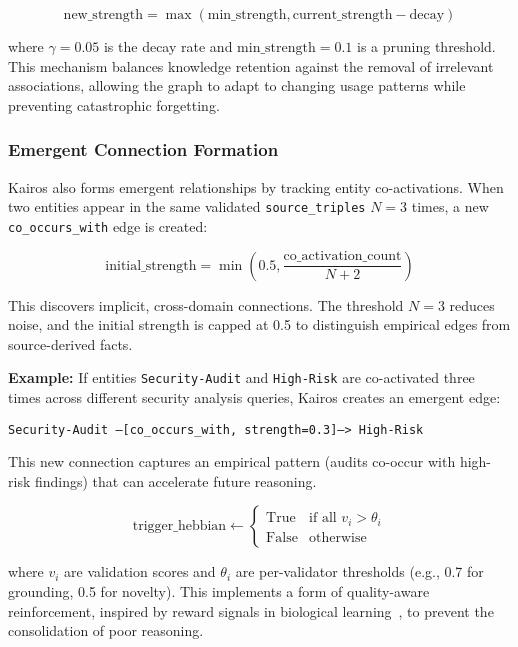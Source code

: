 \documentclass{article}
\begin{document}
\begin{equation}
\text{new\_strength} = \max(\text{min\_strength}, \text{current\_strength} - \text{decay})
\end{equation}

where $\gamma = 0.05$ is the decay rate and $\text{min\_strength} = 0.1$ is a pruning threshold. This mechanism balances knowledge retention against the removal of irrelevant associations, allowing the graph to adapt to changing usage patterns while preventing catastrophic forgetting.

\subsubsection{Emergent Connection Formation}

Kairos also forms emergent relationships by tracking entity co-activations. When two entities appear in the same validated \texttt{source\_triples} $N=3$ times, a new \texttt{co\_occurs\_with} edge is created:

\begin{equation}
\text{initial\_strength} = \min\left(0.5, \frac{\text{co\_activation\_count}}{N + 2}\right)
\end{equation}

This discovers implicit, cross-domain connections. The threshold $N=3$ reduces noise, and the initial strength is capped at 0.5 to distinguish empirical edges from source-derived facts.

\textbf{Example:} If entities \texttt{Security-Audit} and \texttt{High-Risk} are co-activated three times across different security analysis queries, Kairos creates an emergent edge:

\begin{center}
\texttt{Security-Audit --[co\_occurs\_with, strength=0.3]--> High-Risk}
\end{center}

This new connection captures an empirical pattern (audits co-occur with high-risk findings) that can accelerate future reasoning.

\begin{equation}
\text{trigger\_hebbian} \leftarrow \begin{cases}
\text{True} & \text{if all } v_i > \theta_i \\
\text{False} & \text{otherwise}
\end{cases}
\end{equation}

where $v_i$ are validation scores and $\theta_i$ are per-validator thresholds (e.g., 0.7 for grounding, 0.5 for novelty). This implements a form of quality-aware reinforcement, inspired by reward signals in biological learning~\citep{squire2015memory}, to prevent the consolidation of poor reasoning.
\end{document}
